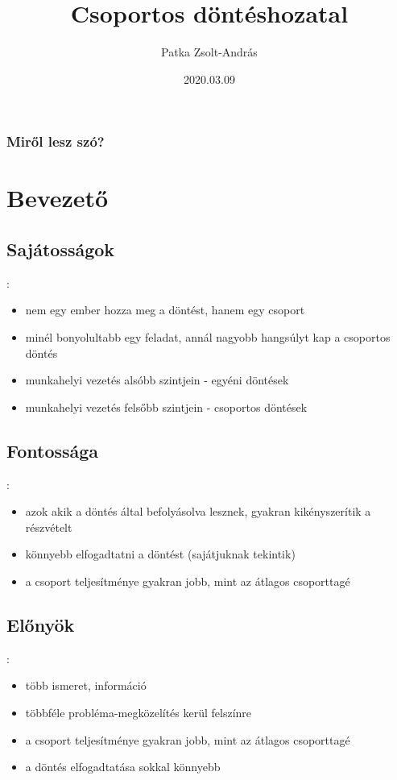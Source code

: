 \documentclass{beamer}
\title{Csoportos döntéshozatal}
\author{Patka Zsolt-András}
\institute{Sapientia EMTE}
\date{2020.03.09}
\begin{document}
\begin{frame}
    \titlepage
\end{frame}

\begin{frame}
\frametitle{Miről lesz szó?}
\tableofcontents
\end{frame}

\section{Bevezető}

\subsection{Sajátosságok}
\begin{frame}{\secname : \subsecname}
    \begin{itemize}
        \item nem egy ember hozza meg a döntést, hanem egy csoport
        \item minél bonyolultabb egy feladat, annál nagyobb hangsúlyt kap a csoportos döntés
        \item munkahelyi vezetés alsóbb szintjein - egyéni döntések
        \item munkahelyi vezetés felsőbb szintjein - csoportos döntések
    \end{itemize}
\end{frame}

\subsection{Fontossága}
\begin{frame}{\secname : \subsecname}
    \begin{itemize}
        \item azok akik a döntés által befolyásolva lesznek, gyakran kikényszerítik a részvételt
        \item könnyebb elfogadtatni a döntést (sajátjuknak tekintik)
        \item a csoport teljesítménye gyakran jobb, mint az átlagos csoporttagé
    \end{itemize}
\end{frame}


\subsection{Előnyök}
\begin{frame}{\secname : \subsecname}
    \begin{itemize}
        \item több ismeret, információ
        \item többféle probléma-megközelítés kerül felszínre
        \item a csoport teljesítménye gyakran jobb, mint az átlagos csoporttagé
        \item a döntés elfogadtatása sokkal könnyebb
    \end{itemize}
\end{frame}
\end{document}
